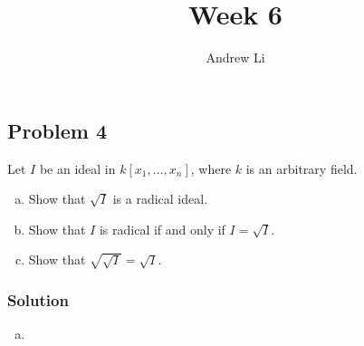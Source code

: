 \documentclass{homework}
\title{Week 6}
\author{Andrew Li}
\begin{document}
    \maketitle
    
    \setcounter{section}{4}
    \setcounter{subsection}{1}
    \subsection{Problem 4}
    Let $I$ be an ideal in $k[x_1, \dots, x_n]$, where $k$ is an arbitrary field.
    \begin{enumerate}[(a)]
        \item Show that $\sqrt{I}$ is a radical ideal.
        \item Show that $I$ is radical if and only if $I = \sqrt{I}$.
        \item Show that $\sqrt{\sqrt{I}} = \sqrt{I}$.
    \end{enumerate}
    
    \subsubsection{Solution}
    \begin{enumerate}[(a)]
        \item 
    \end{enumerate}
\end{document}
